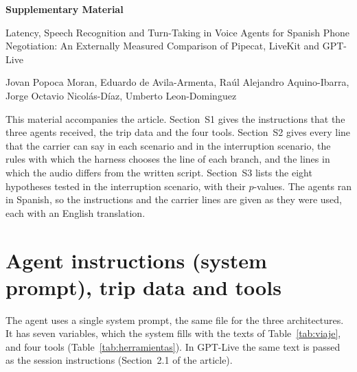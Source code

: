 \documentclass[11pt]{article}
\begin{document}
\begin{center}
{\Large\bfseries Supplementary Material\par}
\vspace{0.3cm}
{\large Latency, Speech Recognition and Turn-Taking in Voice Agents for Spanish Phone
Negotiation: An Externally Measured Comparison of Pipecat, LiveKit and GPT-Live\par}
\vspace{0.3cm}
{\small Jovan Popoca Moran, Eduardo de Avila-Armenta, Raúl Alejandro Aquino-Ibarra,\\
Jorge Octavio Nicolás-Díaz, Umberto Leon-Dominguez\par}
\end{center}
\vspace{0.3cm}

\noindent This material accompanies the article. Section~S1 gives the instructions
that the three agents received, the trip data and the four tools. Section~S2 gives
every line that the carrier can say in each scenario and in the interruption
scenario, the rules with which the harness chooses the line of each branch, and the
lines in which the audio differs from the written script. Section~S3 lists the eight
hypotheses tested in the interruption scenario, with their $p$-values.
The agents ran in Spanish, so the instructions and the carrier lines are given as
they were used, each with an English translation.

\section{Agent instructions (system prompt), trip data and tools}
\label{sec:prompt}

The agent uses a single system prompt, the same file for the three architectures.
It has seven variables, which the system fills with the texts of
Table~\ref{tab:viaje}, and four tools (Table~\ref{tab:herramientas}). In GPT-Live
the same text is passed as the session instructions (Section~2.1 of the article).
\end{document}
